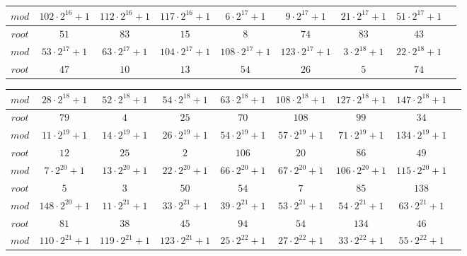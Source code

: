 \documentclass[12pt]{article}
\begin{document}
\begin{tabular}{|c|c|c|c|c|c|c|c|c|}
$mod$& $102\cdot 2^{16}+1$& $112\cdot 2^{16}+1$& $117\cdot 2^{16}+1$& $6\cdot 2^{17}+1$& $9\cdot 2^{17}+1$& $21\cdot 2^{17}+1$& $51\cdot 2^{17}+1$\\
\hline

$root$& $51$& $83$& $15$& $8$& $74$& $83$& $43$\\
\hline


$mod$& $53\cdot 2^{17}+1$& $63\cdot 2^{17}+1$& $104\cdot 2^{17}+1$& $108\cdot 2^{17}+1$& $123\cdot 2^{17}+1$& $3\cdot 2^{18}+1$& $22\cdot 2^{18}+1$\\
\hline

$root$& $47$& $10$& $13$& $54$& $26$& $5$& $74$\\
\hline

\end{tabular}
\begin{tabular}{|c|c|c|c|c|c|c|c|c|}
\hline

$mod$& $28\cdot 2^{18}+1$& $52\cdot 2^{18}+1$& $54\cdot 2^{18}+1$& $63\cdot 2^{18}+1$& $108\cdot 2^{18}+1$& $127\cdot 2^{18}+1$& $147\cdot 2^{18}+1$\\
\hline

$root$& $79$& $4$& $25$& $70$& $108$& $99$& $34$\\
\hline


$mod$& $11\cdot 2^{19}+1$& $14\cdot 2^{19}+1$& $26\cdot 2^{19}+1$& $54\cdot 2^{19}+1$& $57\cdot 2^{19}+1$& $71\cdot 2^{19}+1$& $134\cdot 2^{19}+1$\\
\hline

$root$& $12$& $25$& $2$& $106$& $20$& $86$& $49$\\
\hline


$mod$& $7\cdot 2^{20}+1$& $13\cdot 2^{20}+1$& $22\cdot 2^{20}+1$& $66\cdot 2^{20}+1$& $67\cdot 2^{20}+1$& $106\cdot 2^{20}+1$& $115\cdot 2^{20}+1$\\
\hline

$root$& $5$& $3$& $50$& $54$& $7$& $85$& $138$\\
\hline


$mod$& $148\cdot 2^{20}+1$& $11\cdot 2^{21}+1$& $33\cdot 2^{21}+1$& $39\cdot 2^{21}+1$& $53\cdot 2^{21}+1$& $54\cdot 2^{21}+1$& $63\cdot 2^{21}+1$\\
\hline

$root$& $81$& $38$& $45$& $94$& $54$& $134$& $46$\\
\hline


$mod$& $110\cdot 2^{21}+1$& $119\cdot 2^{21}+1$& $123\cdot 2^{21}+1$& $25\cdot 2^{22}+1$& $27\cdot 2^{22}+1$& $33\cdot 2^{22}+1$& $55\cdot 2^{22}+1$\\
\hline


\end{tabular}
\end{document}
